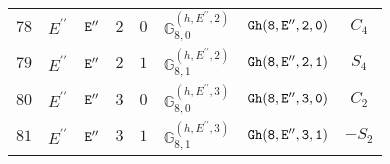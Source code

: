 \documentclass[fleqn,8pt]{jsarticle}
\begin{document}
\begin{table}[ht!]
\begin{center}
\begin{tabular}{cccccccc}
$ 78 $ & $ E^{\prime\prime} $ & $ {\tt E''} $ & $ 2 $ & $ 0 $ & $ \mathbb{G}_{8,0}^{(h,E^{\prime\prime},2)} $ & $ {\tt Gh(8,E'',2,0)} $ & $ C_{4} $ \\
$ 79 $ & $ E^{\prime\prime} $ & $ {\tt E''} $ & $ 2 $ & $ 1 $ & $ \mathbb{G}_{8,1}^{(h,E^{\prime\prime},2)} $ & $ {\tt Gh(8,E'',2,1)} $ & $ S_{4} $ \\
$ 80 $ & $ E^{\prime\prime} $ & $ {\tt E''} $ & $ 3 $ & $ 0 $ & $ \mathbb{G}_{8,0}^{(h,E^{\prime\prime},3)} $ & $ {\tt Gh(8,E'',3,0)} $ & $ C_{2} $ \\
$ 81 $ & $ E^{\prime\prime} $ & $ {\tt E''} $ & $ 3 $ & $ 1 $ & $ \mathbb{G}_{8,1}^{(h,E^{\prime\prime},3)} $ & $ {\tt Gh(8,E'',3,1)} $ & $ - S_{2} $ \\
 \hline \hline
\end{tabular}
\end{center}
\end{table}
\end{document}
